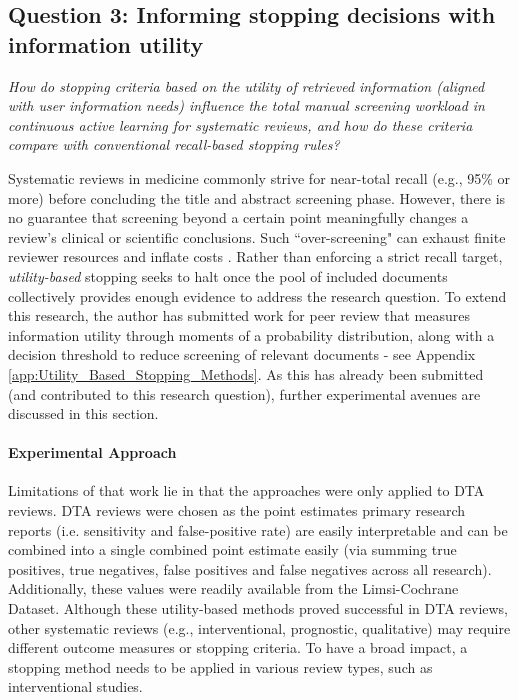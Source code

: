 \documentclass[10pt,oneside]{book}
\begin{document}
\subsection{Question 3: Informing stopping decisions with information utility}


\emph{How do stopping criteria based on the utility of retrieved information (aligned with user information needs) influence the total manual screening workload in continuous active learning for systematic reviews, and how do these criteria compare with conventional recall-based stopping rules?}


Systematic reviews in medicine commonly strive for near-total recall (e.g., 95\% or more) before concluding the title and abstract screening phase. However, there is no guarantee that screening beyond a certain point meaningfully changes a review's clinical or scientific conclusions. Such ``over-screening" can exhaust finite reviewer resources and inflate costs \cite{prabha_what_2007, ilani_analysis_2024}. Rather than enforcing a strict recall target, \emph{utility-based} stopping seeks to halt once the pool of included documents collectively provides enough evidence to address the research question. To extend this research, the author has submitted work for peer review that measures information utility through moments of a probability distribution, along with a decision threshold to reduce screening of relevant documents - see Appendix \ref{app:Utility_Based_Stopping_Methods}. As this has already been submitted (and contributed to this research question), further experimental avenues are discussed in this section.   

\paragraph{Experimental Approach}

Limitations of that work lie in that the approaches were only applied to DTA reviews. DTA reviews were chosen as the point estimates primary research reports (i.e. sensitivity and false-positive rate) are easily interpretable and can be combined into a single combined point estimate easily (via summing true positives, true negatives, false positives and false negatives across all research). Additionally, these values were readily available from the Limsi-Cochrane Dataset. Although these utility-based methods proved successful in DTA reviews, other systematic reviews (e.g., interventional, prognostic, qualitative) may require different outcome measures or stopping criteria. To have a broad impact, a stopping method needs to be applied in various review types, such as interventional studies. 
\end{document}
